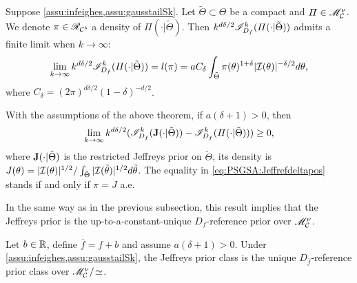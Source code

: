 \begin{thm}\label{thm:refcompactpos}
    Suppose \cref{assu:infeighes,assu:gausstailSk}.  %
    Let $\tilde\Theta\subset\Theta$ be a compact and  $\varPi\in\mathscr{M}_{\mathcal{C}}^\nu$. We denote $\pi\in\mathscr{R}_{\mathcal{C}^b}$ a density of $\varPi(\cdot|\tilde\Theta)$.
    Then $k^{d\delta/2}\mathscr{I}^k_{D_f}(\varPi(\cdot|\tilde\Theta))$ admits a finite limit when $k\to\infty$:
    \begin{equation}\label{eq:liml}
        \lim_{k\rightarrow\infty} k^{d\delta/2} \mathscr{I}^k_{D_f}(\varPi(\cdot|\tilde\Theta)) = l(\pi) =
a C_\delta \int_{\tilde\Theta}\pi(\theta)^{1+\delta} |\mathcal{I}(\theta)|^{-\delta/2}  d\theta ,
    \end{equation}
where $ C_\delta = (2\pi)^{d\delta/2} (1-\delta)^{-d/2}$.
\end{thm}

\begin{prop}\label{prop:JlimIMdeltapos}
    With the assumptions of the above theorem,  if $a(\delta+1)>0$, then
        \begin{equation}\label{eq:PSGSA:Jeffrefdeltapos}
            \lim_{k\rightarrow\infty}k^{d\delta/2}(\mathscr{I}^k_{D_f}(\mathbf{J}(\cdot|\tilde\Theta))-\mathscr{I}_{D_f}^k(\varPi(\cdot|\tilde\Theta)))\geq 0 ,
        \end{equation}
    where $\mathbf{J}(\cdot|\tilde\Theta)$ is the restricted Jeffreys prior on $\tilde\Theta$, its density is $J(\theta) = |\mathcal{I}(\theta)|^{1/2}/\int_{\tilde\Theta}|\mathcal{I}(\tilde\theta)|^{1/2}d\tilde\theta$.
    The equality in \cref{eq:PSGSA:Jeffrefdeltapos} stands if and only if 
    {$\pi=J$} a.e.
\end{prop}


In the same way as in the previous subsection, this result implies that the Jeffreys prior is the up-to-a-constant-unique $D_f$-reference prior over $\mathscr{M}^\nu_{\mathcal{C}}$.

\begin{thm}\label{thm:PSGSA:Jrefdeltapos}
    Let $b\in\mathbb{R}$, define $\overline{f}=f+b$ and assume $a(\delta+1)>0$.
    Under \cref{assu:infeighes,assu:gausstailSk}, the Jeffreys prior class is the unique $D_{\overline f}$-reference prior class over $\mathscr{M}^\nu_{\mathcal{C}}/\!\simeq$.
\end{thm}


